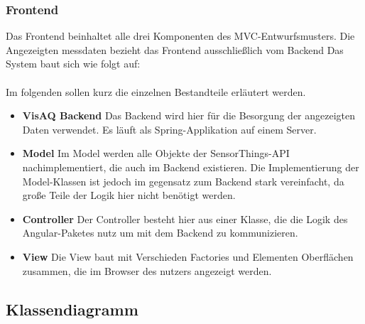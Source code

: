 \subsubsection{Frontend}
Das Frontend beinhaltet alle drei Komponenten des \gls{MVC}-Entwurfsmusters. Die Angezeigten messdaten bezieht das \softwarename Frontend ausschließlich vom \softwarename Backend
Das System baut sich wie folgt auf:
\\

\\
Im folgenden sollen kurz die einzelnen Bestandteile erläutert werden.
\begin{itemize}
    \item \textbf{VisAQ Backend} Das \softwarename Backend wird hier für die Besorgung der angezeigten Daten verwendet. Es läuft als Spring-Applikation auf einem Server.
    \item \textbf{Model} Im Model werden alle Objekte der SensorThings-API nachimplementiert, die auch im Backend existieren.
    Die Implementierung der Model-Klassen ist jedoch im gegensatz zum Backend stark vereinfacht, da große Teile der Logik hier nicht benötigt werden.
    \item \textbf{Controller} Der Controller besteht hier aus einer Klasse, die die Logik des Angular-Paketes nutz um mit dem Backend zu kommunizieren.
    \item \textbf{View} Die View baut mit Verschieden Factories und Elementen Oberflächen zusammen, die im Browser des nutzers angezeigt werden.
\end{itemize}

\subsection{Klassendiagramm}
